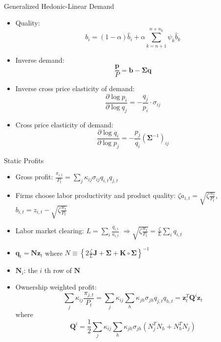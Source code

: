 \documentclass[
  10pt, %
  aspectratio=169,  %
  handout
]{beamer}
\theoremstyle{plain}
\begin{document}
\begin{frame}{Generalized Hedonic-Linear Demand \citep{Pellegrino2024-dn}}
  \begin{itemize}
    \item Quality:
          \[
            b_{i}=\left(1-\alpha\right)\hat{b}_{i}+\alpha\sum_{k=n+1}^{n+n_{k}}\psi_{k}\hat{b}_{k}
          \]
    \item Inverse demand:
          \[
            \frac{\boldsymbol{p}}{P}=\boldsymbol{b}-\boldsymbol{\Sigma}\boldsymbol{q}
          \]
    \item Inverse cross price elasticity of demand:
          \[
            \frac{\partial\log p_{i}}{\partial\log q_{j}}=-\frac{q_{j}}{p_{i}}\cdot\sigma_{ij}
          \]
    \item Cross price elasticity of demand:
          \[
            \frac{\partial\log q_{i}}{\partial\log p_{j}}=-\frac{p_{j}}{q_{i}}(\boldsymbol{\Sigma}^{-1})_{ij}
          \]
  \end{itemize}
\end{frame}
%
\begin{frame}{Static Profits}
  \begin{itemize}
    \item \label{Q} Gross profit: $\frac{\pi_{i,t}}{P_{t}}=\sum_{j}\kappa_{ij}\sigma_{ij}q_{i,t}q_{j,t}$
    \item Firms choose labor productivity and product quality: $\zeta a_{i,t}=\sqrt{\zeta\frac{w_{t}}{P_{t}}}$,
          $b_{i,t}=z_{i,t}-\sqrt{\zeta\frac{w_{t}}{P_{t}}}$
    \item Labor market clearing: $L=\sum_{i}\frac{q_{i,t}}{a_{i,t}}$ $\Longrightarrow$$\sqrt{\zeta\frac{w_{t}}{P_{t}}}=\frac{\zeta}{L}\sum_{i}q_{i,t}$
    \item $\boldsymbol{q}_{t}=\boldsymbol{N}\boldsymbol{z}_{t}$ where $N\equiv\left\{ 2\frac{\zeta}{L}\boldsymbol{J}+\boldsymbol{\Sigma}+\boldsymbol{K}\circ\boldsymbol{\Sigma}\right\} ^{-1}$
    \item $\boldsymbol{N}_{i}$: the $i$ th row of $\boldsymbol{N}$
    \item Ownership weighted profit:
          {\small
          \[
            \sum_{j}\kappa_{ij}\frac{\pi_{j,t}}{P_{t}}=\sum_{j}\kappa_{ij}\sum_{h}\kappa_{jh}\sigma_{jh}q_{j,t}q_{h,t}=\boldsymbol{z}_{t}^{T}\boldsymbol{Q}^{i}\boldsymbol{z}_{t}
          \]}
          where
          {\small
          \[
            \boldsymbol{Q}^{i}=\frac{1}{2}\sum_{j}\kappa_{ij}\sum_{h}\kappa_{jh}\sigma_{jh}\left(N_{j}^{T}N_{h}+N_{h}^{T}N_{j}\right)
          \]
          }
          \hyperlink{cournot}{}
  \end{itemize}
\end{frame}
\end{document}
